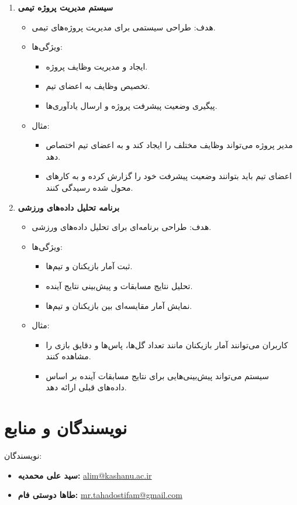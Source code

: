 \documentclass[b5paper,12pt]{article}
\begin{document}
\begin{enumerate}
			\item \textbf{سیستم مدیریت پروژه تیمی}
			\begin{itemize}
				\item هدف: طراحی سیستمی برای مدیریت پروژه‌های تیمی.
				\item ویژگی‌ها:
				\begin{itemize}
					\item ایجاد و مدیریت وظایف پروژه.
					\item تخصیص وظایف به اعضای تیم.
					\item پیگیری وضعیت پیشرفت پروژه و ارسال یادآوری‌ها.
				\end{itemize}
				\item مثال:
				\begin{itemize}
					\item مدیر پروژه می‌تواند وظایف مختلف را ایجاد کند و به اعضای تیم اختصاص دهد.
					\item اعضای تیم باید بتوانند وضعیت پیشرفت خود را گزارش کرده و به کارهای محول شده رسیدگی کنند.
				\end{itemize}
			\end{itemize}
			
			\item \textbf{برنامه تحلیل داده‌های ورزشی}
			\begin{itemize}
				\item هدف: طراحی برنامه‌ای برای تحلیل داده‌های ورزشی.
				\item ویژگی‌ها:
				\begin{itemize}
					\item ثبت آمار بازیکنان و تیم‌ها.
					\item تحلیل نتایج مسابقات و پیش‌بینی نتایج آینده.
					\item نمایش آمار مقایسه‌ای بین بازیکنان و تیم‌ها.
				\end{itemize}
				\item مثال:
				\begin{itemize}
					\item کاربران می‌توانند آمار بازیکنان مانند تعداد گل‌ها، پاس‌ها و دقایق بازی را مشاهده کنند.
					\item سیستم می‌تواند پیش‌بینی‌هایی برای نتایج مسابقات آینده بر اساس داده‌های قبلی ارائه دهد.
				\end{itemize}
			\end{itemize}
			
		\end{enumerate}

		\newpage
		\section*{نویسندگان و منابع}

		نویسندگان: 
		\begin{itemize}
			\item \textbf{سید علی محمدیه: } \href{mailto:alim@kashanu.ac.ir}{alim@kashanu.ac.ir}
			\item \textbf{طاها دوستی فام:} \href{mailto:mr.tahadostifam@gmail.com}{mr.tahadostifam@gmail.com}
		\end{itemize}			
\end{document}
